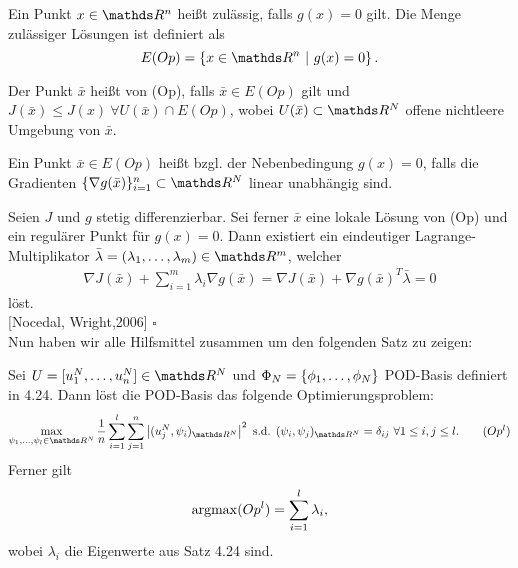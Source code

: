 Ein Punkt $x\in\R^n$ heißt zulässig, falls $g(x)=0$ gilt.
Die Menge zulässiger Lösungen ist definiert als
\[
E(Op) = \penbrace{x\in \R^n~|~g(x)=0}.
\]

Der Punkt $\bar{x}$ heißt  von (Op), falls $\bar{x}\in E(Op)$ gilt und $J(\bar{x})\le J(x) ~\forall U(\bar{x})\cap E(Op)$, wobei $U(\bar{x})\subset \R^N$ offene nichtleere Umgebung von $\bar{x}$.

Ein Punkt $\bar{x}\in E(Op)$ heißt  bzgl. der Nebenbedingung $g(x)=0$, falls die Gradienten $\{\nabla g(\bar{x})\}_{i=1}^n\subset \R^N$ linear unabhängig sind.

Seien $J$ und $g$ stetig differenzierbar.
Sei ferner $\bar{x}$ eine lokale Lösung von (Op) und ein regulärer Punkt für $g(x)=0$.
Dann existiert ein eindeutiger Lagrange-Multiplikator $\bar{\lambda}=(\lambda_1\dt{,}\lambda_m)\in \R^m$, welcher
\begin{align}
\nabla J(\bar{x}) + \sum_{i=1}^m \lambda_i \nabla g(\bar{x}) = \nabla J(\bar{x}) + \nabla g(\bar{x})^T \bar{\lambda} =0 
\end{align}
löst.\\

 [Nocedal, Wright,2006]
\hfill $\square$\\
Nun haben wir alle Hilfsmittel zusammen um den folgenden Satz zu zeigen:

Sei $U = [u_1^N\dt{,}u_n^N]\in \R^N$ und $\Phi_N=\{\phi_1, \dots ,\phi_N\}$ POD-Basis definiert in 4.24.
Dann löst die POD-Basis das folgende Optimierungsproblem:
\begin{align*}
\max\limits_{\psi_1\dt{,}\psi_l\in \R^N} \frac{1}{n} \sum_{i=1}^l \sum_{j=1}^n \abs{(u_j^N,\psi_i)_{\R^N}}^2 \text{ s.d. } (\psi_i,\psi_j)_{\R^N} = \delta_{ij} ~\forall 1\le i,j\le l. \tag*{$(Op^l)$}
\end{align*}
Ferner gilt 
\[
\operatorname{argmax} (Op^l) = \sum_{i=1}^l \lambda_i,
\]
wobei $\lambda_i$ die Eigenwerte aus Satz 4.24 sind.

